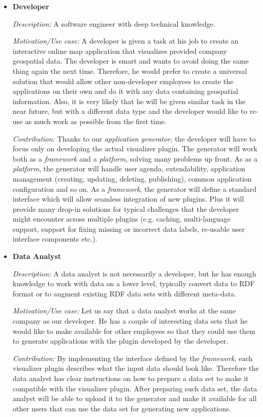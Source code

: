 \begin{itemize}
\item \textbf{Developer}

\textit{Description:} A software engineer with deep technical knowledge.

\textit{Motivation/Use case:} A developer is given a task at his job to create an interactive online map application that visualizes provided company geospatial data. The developer is smart and wants to avoid doing the same thing again the next time. Therefore, he would prefer to create a universal solution that would allow other non-developer employees to create the applications on their own and do it with any data containing geospatial information. Also, it is very likely that he will be given similar task in the near future, but with a different data type and the developer would like to re-use as much work as possible from the first time.

\textit{Contribution:} Thanks to our \emph{application generator}, the developer will have to focus only on developing the actual visualizer plugin. The generator will work both as a \emph{framework} and a \emph{platform}, solving many problems up front. As as a \emph{platform}, the generator will handle user agenda, extendability, application management (creating, updating, deleting, publishing), common application configuration and so on. As a \emph{framework}, the generator will define a standard  interface which will allow seamless integration of new plugins. Plus it will provide many drop-in solutions for typical challenges that the developer might encounter across multiple plugins (e.g. caching, multi-language support, support for fixing missing or incorrect data labels, re-usable user interface components etc.).

\item \textbf{Data Analyst}

\textit{Description:} A data analyst is not necessarily a developer, but he has enough knowledge to work with data on a lower level, typically convert data to RDF format or to augment existing RDF data sets with different meta-data. 

\textit{Motivation/Use case:} Let us say that a data analyst works at the same company as our developer. He has a couple of interesting data sets that he would like to make available for other employees so that they could use them to generate applications with the plugin developed by the developer.

\textit{Contribution:} By implementing the interface defined by the \emph{framework}, each visualizer plugin describes what the input data should look like. Therefore the data analyst has clear instructions on how to prepare a data set to make it compatible with the visualizer plugin. After preparing such data set, the data analyst will be able to upload it to the generator and make it available for all other users that can use the data set for generating new applications.


\end{itemize}
